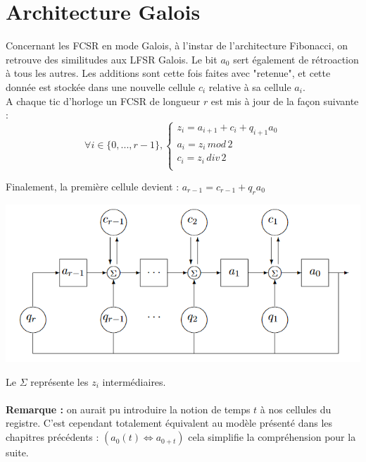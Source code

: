 \documentclass[11pt]{report}
\begin{document}
\section{Architecture Galois}
	
	Concernant les FCSR en mode Galois, à l'instar de l'architecture Fibonacci, on retrouve des similitudes aux LFSR Galois. Le bit $a_0$ sert également de rétroaction à tous les autres. Les additions sont cette fois faites avec "retenue", et cette donnée est stockée dans une nouvelle cellule $c_i$ relative à sa cellule $a_i$.
	\\
	A chaque tic d'horloge un FCSR de longueur $r$ est mis à jour de la façon suivante : 
	$$	
	\forall i \in \{0,...,r-1\},
	 \left\{
	 \begin{array}{ccc}
	 z_i = a_{i+1} + c_i + q_{i+1}a_0\\
	 a_i = z_i \, mod \,2\\
	 c_i = z_i \, div \,2\\
	 \end{array} 
	\right. 
	$$
	
	Finalement, la première cellule devient : $a_{r-1}=c_{r-1}+q_ra_0$
	
	\begin{center}
	
	\includegraphics[scale=0.7]{GaloisFCSR.png}
	\label{FCSRGalois}
	\end{center}
	
	Le $\Sigma$ représente les $z_i$ intermédiaires.
	\\\\
\textbf{Remarque :} on aurait pu introduire la notion de temps $t$ à nos cellules du registre. C'est cependant totalement équivalent au modèle présenté dans les chapitres précédents : $(a_0(t) \Leftrightarrow a_{0+t})$ cela simplifie la compréhension pour la suite. \\\\
\end{document}

